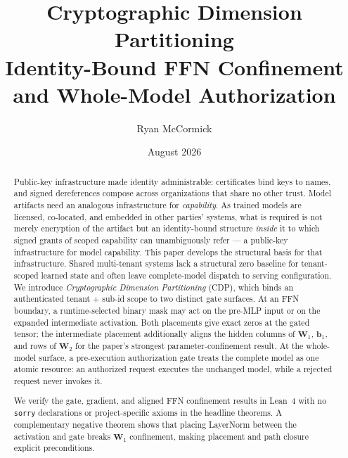 \documentclass[11pt,a4paper]{article}
\title{\textbf{Cryptographic Dimension Partitioning} \\
\large{Identity-Bound FFN Confinement and Whole-Model Authorization}}
\author[1]{Ryan McCormick}
\affil[1]{Independent Researcher}
\date{August 2026}
\newcommand{\bW}{\mathbf{W}}
\begin{document}
\maketitle

\begin{abstract}
Public-key infrastructure made identity administrable: certificates
bind keys to names, and signed dereferences compose across
organizations that share no other trust.  Model artifacts need an
analogous infrastructure for \emph{capability}.  As trained models are
licensed, co-located, and embedded in other parties' systems, what is
required is not merely encryption of the artifact but an
identity-bound structure \emph{inside} it to which signed grants of
scoped capability can unambiguously refer --- a public-key
infrastructure for model capability.  This paper develops the
structural basis for that infrastructure.
Shared multi-tenant systems lack a structural zero baseline for
tenant-scoped learned state and often leave complete-model dispatch to
serving configuration.  We introduce \emph{Cryptographic Dimension
Partitioning} (CDP), which binds an authenticated tenant + sub-id scope
to two distinct gate surfaces.  At an FFN boundary, a runtime-selected
binary mask may act on the pre-MLP input or on the expanded
intermediate activation.  Both placements give exact zeros at the
gated tensor; the intermediate placement additionally aligns the
hidden columns of $\bW_1$, $\mathbf b_1$, and rows of $\bW_2$ for the
paper's strongest parameter-confinement result.  At the whole-model
surface, a pre-execution authorization gate treats the complete model
as one atomic resource: an authorized request executes the unchanged
model, while a rejected request never invokes it.

We verify the gate, gradient, and aligned FFN confinement results in
Lean~4 with no \texttt{sorry} declarations or project-specific axioms
in the headline theorems.  A complementary negative theorem shows
that placing LayerNorm between the activation and gate breaks
$\bW_1$ confinement, making placement and path closure explicit
preconditions.


\end{abstract}
\end{document}
